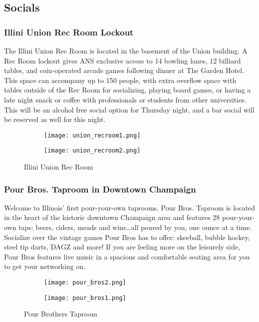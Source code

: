 \subsection{Socials}

\subsubsection{Illini Union Rec Room Lockout}
The Illini Union Rec Room is located in the basement of the Union building. A Rec Room lockout gives ANS exclusive access to 14 bowling lanes, 12 billiard tables, and coin-operated arcade games following dinner at The Garden Hotel. This space can accompany up to 150 people, with extra overflow space with tables outside of the Rec Room for socializing, playing board games, or having a late night snack or coffee with professionals or students from other universities. This will be an alcohol free social option for Thursday night, and a bar social will be reserved as well for this night.
\vspace{0.5cm}\newline
\begin{figure}[H]
	\centering
	\begin{subfigure}{0.5\textwidth}
		\centering
		\texttt{[image: union\_recroom1.png]}
	\end{subfigure}%
	\begin{subfigure}{0.5\textwidth}
		\centering
		\texttt{[image: union\_recroom2.png]}
	\end{subfigure}	
	\caption{Illini Union Rec Room}	
\end{figure} 

\subsubsection{Pour Bros. Taproom in Downtown Champaign}
Welcome to Illinois' first pour-your-own taprooms. Pour Bros. Taproom is located in the heart of the historic downtown Champaign area and features 28 pour-your-own taps: beers, ciders, meads and wine\ldots all poured by you, one ounce at a time. Socialize over the vintage games Pour Bros has to offer: skeeball, bubble hockey, steel tip darts, DAGZ and more! If you are feeling more on the leisurely side, Pour Bros features live music in a spacious and comfortable seating area for you to get your networking on.
\vspace{0.5cm}\newline
\begin{figure}[H]

	\centering
	\begin{subfigure}{0.5\textwidth}
		\centering
		\texttt{[image: pour\_bros2.png]}
	\end{subfigure}%
	\begin{subfigure}{0.5\textwidth}
		\centering
		\texttt{[image: pour\_bros1.png]}
	\end{subfigure}	
	\caption{Pour Brothers Taproom}	
\end{figure} 

